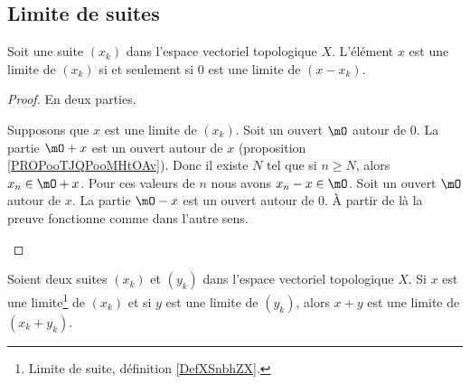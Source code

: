 \subsection{Limite de suites}

\begin{proposition}	\label{PROPooTJQPooMHtOAv}
	Soit une suite \( (x_k)\) dans l'espace vectoriel topologique \( X\). L'élément \( x\) est une limite de \( (x_k)\) si et seulement si \( 0\) est une limite de \( (x-x_k)\).
\end{proposition}

\begin{proof}
	En deux parties.
	\begin{subproof}
		\spitem[\( \Rightarrow\)]
		Supposons que \( x\) est une limite de \( (x_k)\). Soit un ouvert \( \mO\) autour de \( 0\). La partie \( \mO+x\) est un ouvert autour de \( x\) (proposition \ref{PROPooTJQPooMHtOAv}). Donc il existe \( N\) tel que si \( n\geq N\), alors \( x_n\in\mO+x\). Pour ces valeurs de \( n\) nous avons \( x_n-x\in\mO\).
		\spitem[\( \Leftarrow\)]
		Soit un ouvert \( \mO\) autour de \( x\). La partie \( \mO-x\) est un ouvert autour de \( 0\). À partir de là la preuve fonctionne comme dans l'autre sens.
	\end{subproof}
\end{proof}

\begin{proposition}		\label{PROPooQIQSooHbNkIy}
	Soient deux suites \( (x_k)\) et \( (y_k)\) dans l'espace vectoriel topologique \( X\). Si \( x\) est une limite\footnote{Limite de suite, définition \ref{DefXSnbhZX}.} de \( (x_k)\) et si \( y\) est une limite de \( (y_k)\), alors \( x+y\) est une limite de \( (x_k+y_k)\).
\end{proposition}

